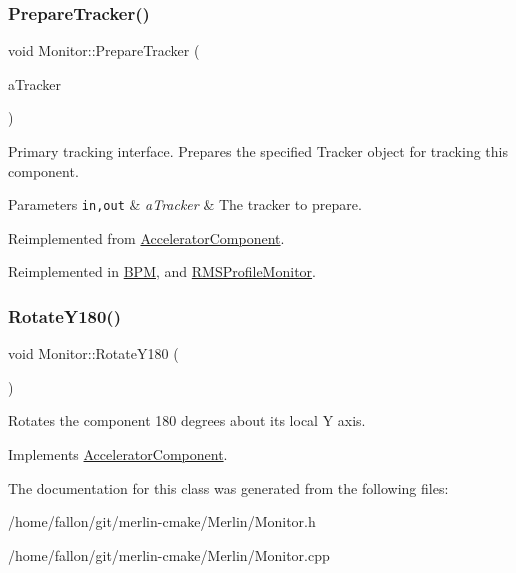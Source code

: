 \mbox{\label{classMonitor_a8d5e3ab0d68f89a51aabdcde2b01977a}} 
\subsubsection{\texorpdfstring{Prepare\+Tracker()}{PrepareTracker()}}
{\footnotesize\ttfamily void Monitor\+::\+Prepare\+Tracker (\begin{DoxyParamCaption}\item[{\hyperlink{classComponentTracker}{Component\+Tracker} \&}]{a\+Tracker }\end{DoxyParamCaption})\hspace{0.3cm}{\ttfamily [virtual]}}

Primary tracking interface. Prepares the specified Tracker object for tracking this component. 
\begin{DoxyParams}[1]{Parameters}
\mbox{\tt in,out}  & {\em a\+Tracker} & The tracker to prepare. \\
\hline
\end{DoxyParams}


Reimplemented from \hyperlink{classAcceleratorComponent_ab897c54689ac946f40c3ad0716ddd4bb}{Accelerator\+Component}.



Reimplemented in \hyperlink{classBPM_a3f0db54eff4f4e95fc2dd81728ea8759}{B\+PM}, and \hyperlink{classRMSProfileMonitor_ae5c6ecda857727f6ac78da99b08c88c1}{R\+M\+S\+Profile\+Monitor}.

\mbox{\label{classMonitor_ad4af2f46ca124bf0c958eca70a2c2769}} 
\subsubsection{\texorpdfstring{Rotate\+Y180()}{RotateY180()}}
{\footnotesize\ttfamily void Monitor\+::\+Rotate\+Y180 (\begin{DoxyParamCaption}{ }\end{DoxyParamCaption})\hspace{0.3cm}{\ttfamily [virtual]}}

Rotates the component 180 degrees about its local Y axis. 

Implements \hyperlink{classAcceleratorComponent_a8bf0d39b56578ca99f286ca1504b9072}{Accelerator\+Component}.



The documentation for this class was generated from the following files\+:\begin{DoxyCompactItemize}
\item 
/home/fallon/git/merlin-\/cmake/\+Merlin/Monitor.\+h\item 
/home/fallon/git/merlin-\/cmake/\+Merlin/Monitor.\+cpp\end{DoxyCompactItemize}

